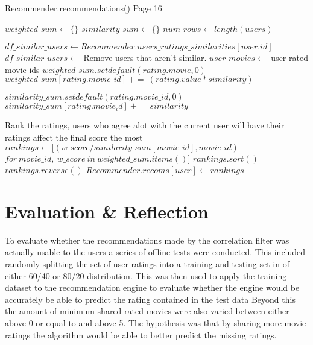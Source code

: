 	\begin{algorithm}[H]
		\caption{Recommender.recommendations() Page 16 \cite{Lead}}
		\label{alg:recommendations}
		\begin{algorithmic}
			\STATE $weighted\_sum \leftarrow \{\}$
			\STATE $similarity\_sum \leftarrow \{\}$
			\STATE $num\_rows \leftarrow length(users)$
			
				\STATE $df\_similar\_users \leftarrow Recommender.users\_ratings\_similarities[user.id]$
				\STATE $df\_similar\_users \leftarrow $ Remove users that aren't similar.
				\STATE $user\_movies \leftarrow $ user rated movie ids
								\STATE $weighted\_sum.setdefault(rating.movie, 0) $
								\STATE $weighted\_sum[rating.movie\_id]\  + =\ (rating.value * similarity)$
								
								\STATE $similarity\_sum.setdefault(rating.movie\_id, 0)$
								\STATE $similarity\_sum[rating.movie_id]\ + =\ similarity$
							\ENDIF
						\ENDFOR
					\ENDIF
				\ENDFOR
			
				\STATE Rank the ratings, users who agree alot with the current user will have their ratings affect the final score the most
				\STATE $rankings \leftarrow [(w\_score / similarity\_sum[movie\_id], movie\_id)$
				\bindent
				    \STATE $for\ movie\_id,\ w\_score\ in\ weighted\_sum.items()]$  
				\eindent
				\STATE $rankings.sort()$
				\STATE $rankings.reverse()$
				\STATE $Recommender.recoms[user] \leftarrow rankings$
			\ENDFOR
		\end{algorithmic}
	\end{algorithm}


\section{Evaluation \& Reflection}

To evaluate whether the recommendations made by the correlation filter was actually usable to the users a series of offline tests were conducted. This included randomly splitting the set of user ratings into a training and testing set in of either 60/40 or 80/20 distribution. This was then used to apply the training dataset to the recommendation engine to evaluate whether the engine would be accurately be able to predict the rating contained in the test data Beyond this the amount of minimum shared rated movies were also varied between either above 0 or equal to and above 5. The hypothesis was that by sharing more movie ratings the algorithm would be able to better predict the missing ratings.

